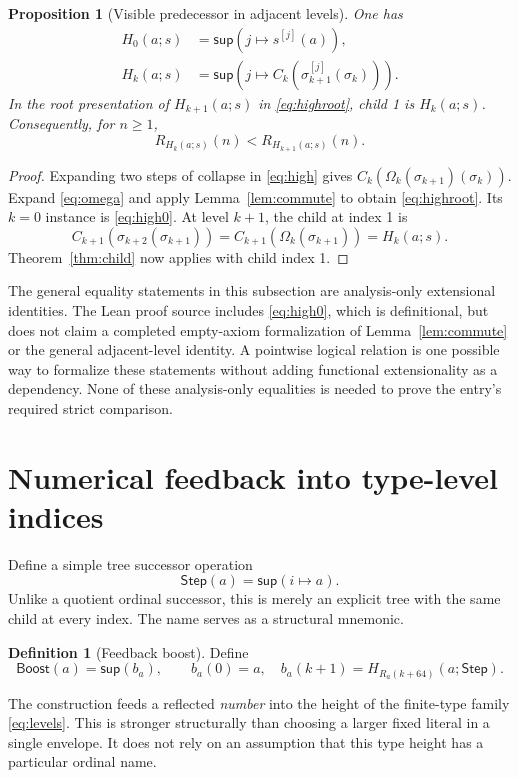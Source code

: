 \documentclass[11pt]{article}
\newtheorem{proposition}[theorem]{Proposition}
\theoremstyle{definition}
\newtheorem{definition}[theorem]{Definition}
\newcommand{\Sup}{\mathsf{sup}}
\newcommand{\Boost}{\mathsf{Boost}}
\newcommand{\Step}{\mathsf{Step}}
\begin{document}
\begin{proposition}[Visible predecessor in adjacent levels]\label{prop:adjacent}
One has
\begin{align}
 H_0(a;s)&=\Sup(j\mapsto s^{[j]}(a)),\label{eq:high0}\\
 H_k(a;s)&=\Sup(j\mapsto C_k(\sigma_{k+1}^{[j]}(\sigma_k))).
 \label{eq:highroot}
\end{align}
In the root presentation of $H_{k+1}(a;s)$ in \eqref{eq:highroot}, child 1 is
$H_k(a;s)$. Consequently, for $n\ge1$,
\[
 R_{H_k(a;s)}(n)<R_{H_{k+1}(a;s)}(n).
\]
\end{proposition}
\begin{proof}
Expanding two steps of collapse in \eqref{eq:high} gives
$C_k(\Omega_k(\sigma_{k+1})(\sigma_k))$. Expand \eqref{eq:omega} and apply
Lemma~\ref{lem:commute} to obtain \eqref{eq:highroot}. Its $k=0$ instance
is \eqref{eq:high0}. At level $k+1$, the child at index 1 is
\[
 C_{k+1}(\sigma_{k+2}(\sigma_{k+1}))
 =C_{k+1}(\Omega_k(\sigma_{k+1}))=H_k(a;s).
\]
Theorem~\ref{thm:child} now applies with child index 1.
\end{proof}

The general equality statements in this subsection are analysis-only
extensional identities. The Lean proof source includes \eqref{eq:high0},
which is definitional, but does not claim a completed empty-axiom
formalization of Lemma~\ref{lem:commute} or the general adjacent-level
identity. A pointwise logical relation is one possible way to formalize
these statements without adding functional extensionality as a dependency.
None of these analysis-only equalities is needed to prove the entry's
required strict comparison.

\section{Numerical feedback into type-level indices}
\label{sec:grand}

Define a simple tree successor operation
\[
 \Step(a)=\Sup(i\mapsto a).
\]
Unlike a quotient ordinal successor, this is merely an explicit tree with
the same child at every index. The name serves as a structural mnemonic.

\begin{definition}[Feedback boost]\label{def:boost}
Define
\begin{equation}\label{eq:boost}
 \Boost(a)=\Sup(b_a),\qquad
 b_a(0)=a,\quad
 b_a(k+1)=H_{R_a(k+64)}(a;\Step).
\end{equation}
\end{definition}
The construction feeds a reflected \emph{number} into the height of the
finite-type family \eqref{eq:levels}. This is stronger structurally than
choosing a larger fixed literal in a single envelope. It does not rely on
an assumption that this type height has a particular ordinal name.
\end{document}
